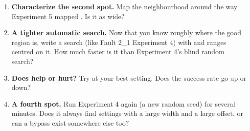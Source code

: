 \documentclass[11pt,letterpaper]{article}
\begin{document}

\begin{enumerate}[label=\arabic*.,leftmargin=1.8em,itemsep=2pt,topsep=2pt,parsep=0pt,start=1]
\item \textbf{Characterize the second spot.} Map the neighbourhood around  the way Experiment 5 mapped . Is it as wide?
\item \textbf{A tighter automatic search.} Now that you know roughly where the good region is, write a  search (like Fault 2\_1 Experiment 4) with  and  ranges centred on it. How much faster is it than Experiment 4's blind random search?
\item \textbf{Does  help or hurt?} Try  at your best setting. Does the success rate go up or down?
\item \textbf{A fourth spot.} Run Experiment 4 again (a new random seed) for several minutes. Does it always find settings with a large width and a large offset, or can a bypass exist somewhere else too?
\end{enumerate}

\end{document}
